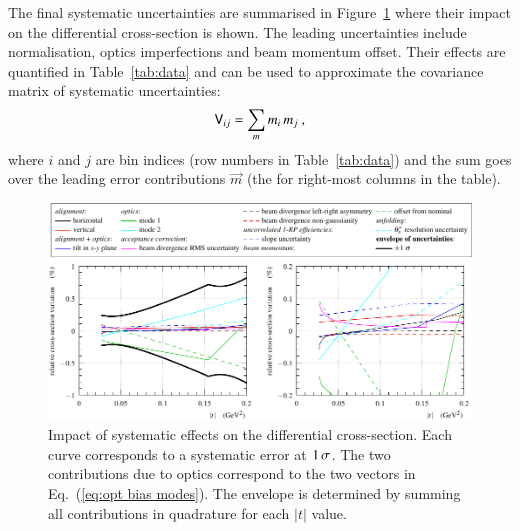 The final systematic uncertainties are summarised in Figure~\ref{fig:syst unc} where their impact on the differential cross-section is shown. The leading uncertainties include normalisation, optics imperfections and beam momentum offset. Their effects are quantified in Table~\ref{tab:data} and can be used to approximate the covariance matrix of systematic uncertainties:
\begin{equation}
\label{eq:covar mat}
\mathsf{V}_{ij} = \sum_{m} m_i\, m_j\ ,
\end{equation}
where $i$ and $j$ are bin indices (row numbers in Table~\ref{tab:data}) and the sum goes over the leading error contributions $\vec m$ (the for right-most columns in the table).

\begin{figure}
\begin{center}
\includegraphics{fig/direct_method_mode_cmp_presentation.pdf}
\vskip-3mm
\caption{%
Impact of systematic effects on the differential cross-section. Each curve corresponds to a systematic error at $1\,{\rm \sigma}$.
The two contributions due to optics correspond to the two vectors in Eq.~(\ref{eq:opt bias modes}).
The envelope is determined by summing all contributions in quadrature for each $|t|$ value.
}
\label{fig:syst unc}
\end{center}
\end{figure}



